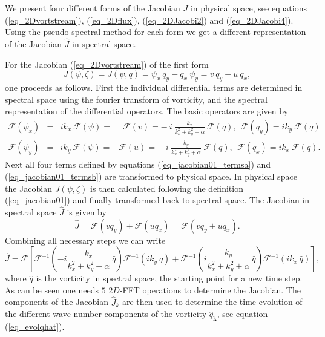 We present four different forms of the Jacobian $J$ in physical space, 
see equations (\ref{eq_2Dvortstream}), (\ref{eq_2Dflux}), 
(\ref{eq_2DJacobi2}) and (\ref{eq_2DJacobi4}). Using the pseudo-spectral 
method for each form we get a different representation of the 
Jacobian $\hat{J}$ in spectral space.   

For the Jacobian (\ref{eq_2Dvortstream}) of the first form
\begin{equation} \label{eq_jacobian01}
  J(\psi,\zeta) 
   = 
  J(\psi,q) 
   = 
  \psi_{x} \ q_{y} 
   -   
  q_{x} \  \psi_{y}
   =
   v \ q_{y}  + u \  q_{x},
\end{equation}
one proceeds as follows. First the individual differential terms 
are determined in spectral space using the fourier transform of 
vorticity, and the spectral representation of the differential 
operators. The basic operators are given by 
\begin{eqnarray} \label{eq_jacobian01_termsa}
  \mathcal{F}(\psi_{x})
  &=& 
  i  k_{x} \ \mathcal{F}(\psi)
   =
  \phantom{-} \mathcal{F}(v)
   = 
  - \ i \ \frac{k_{x}}{k^{2}_{x} + k^{2}_{y} + \alpha} \ 
  \mathcal{F}(q),
  \ \ 
  \mathcal{F}(q_{y})
   = 
  i k_{y} \ \mathcal{F}(q) \ \ \
  \\ \label{eq_jacobian01_termsb}
  \mathcal{F}(\psi_{y})
  &=&
  i  k_{y} \ \mathcal{F}(\psi)
   =
  - \mathcal{F}(u)
   = 
  - \ i \ \frac{k_{y}}{k^{2}_{x} + k^{2}_{y} + \alpha} \ 
  \mathcal{F}(q),
  \ \
  \mathcal{F}(q_{x})
   = 
  i k_{x} \ \mathcal{F}(q). \ \ \ 
\end{eqnarray}
Next all four terms defined by equations (\ref{eq_jacobian01_termsa}) 
and (\ref{eq_jacobian01_termsb}) are transformed to physical space. 
In physical space the Jacobian $J(\psi,\zeta)$ is then 
calculated following the definition (\ref{eq_jacobian01}) and finally
transformed back to spectral space. The Jacobian in spectral space 
$\hat{J}$ is given by
\begin{equation} \label{eq_jacobian01_J}
  \hat{J} 
   = 
  \mathcal{F}(v q_{y})
   +
  \mathcal{F}(u q_{x})
   = 
  \mathcal{F}(v q_{y} + u q_{x}).
\end{equation}
Combining all necessary steps we can write
\begin{equation} \label{eq_jacobian01_Jall}
  \hat{J} 
   =
  \mathcal{F}
   \left[
    \mathcal{F}^{-1} 
     \left(
       - i \frac{k_{x}}{k^{2}_{x}+k^{2}_{y}+\alpha} \ 
      \hat{q}
     \right) 
    \mathcal{F}^{-1} 
     \left(
      ik_{y} \ \hat{q}
     \right)
       +
    \mathcal{F}^{-1} 
     \left(
      i \frac{k_{y}}{k^{2}_{x}+k^{2}_{y}+\alpha} \ 
      \hat{q}
     \right) 
    \mathcal{F}^{-1}
     \left(
      ik_{x} \ \hat{q}
     \right)
   \right],
\end{equation}
where $\hat{q}$ is the vorticity in spectral space, the starting point
for a new time step. As can be seen one needs $5$ $2D$-FFT operations
to determine the Jacobian. The components of the Jacobian 
$\hat{J}_{k}$ are then used to determine the time 
evolution of the different wave number components of the vorticity 
$\hat{q}_{\mathbf{k}}$, see equation (\ref{eq_evolqhat}). 

